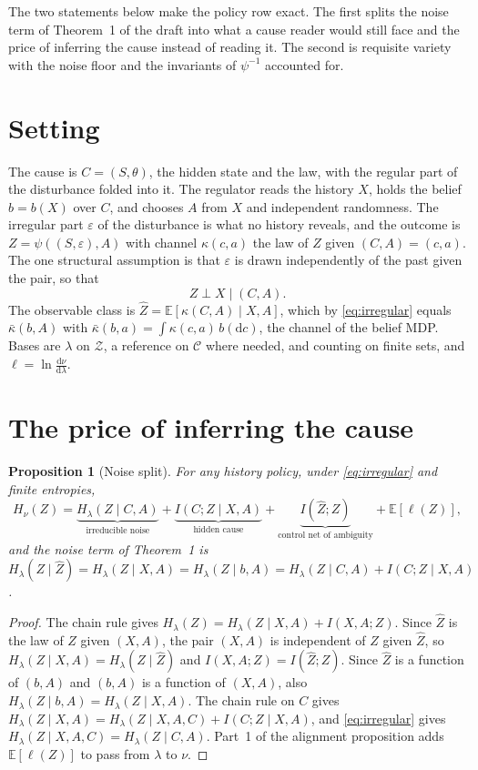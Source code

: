 \documentclass[10pt]{article}
\theoremstyle{plain}
\newtheorem{proposition}{Proposition}
\theoremstyle{remark}
\newcommand{\E}{\mathbb E}
\newcommand{\Zcal}{\mathcal Z}
\newcommand{\Ccal}{\mathcal C}
\newcommand{\dd}{\mathrm d}
\begin{document}
The two statements below make the policy row exact.
The first splits the noise term of Theorem~1 of the draft into what a cause reader would still face and the price of inferring the cause instead of reading it.
The second is requisite variety with the noise floor and the invariants of $\psi^{-1}$ accounted for.

\section{Setting}
The cause is $C = (S, \theta)$, the hidden state and the law, with the regular part of the disturbance folded into it.
The regulator reads the history $X$, holds the belief $b = b(X)$ over $C$, and chooses $A$ from $X$ and independent randomness.
The irregular part $\varepsilon$ of the disturbance is what no history reveals, and the outcome is $Z = \psi((S,\varepsilon), A)$ with channel $\kappa(c,a)$ the law of $Z$ given $(C,A) = (c,a)$.
The one structural assumption is that $\varepsilon$ is drawn independently of the past given the pair, so that
\begin{equation}
  Z \perp X \mid (C, A).
  \label{eq:irregular}
\end{equation}
The observable class is $\hat Z = \E[\kappa(C,A) \mid X, A]$, which by \eqref{eq:irregular} equals $\bar\kappa(b, A)$ with $\bar\kappa(b,a) = \int \kappa(c,a)\, b(\dd c)$, the channel of the belief MDP.
Bases are $\lambda$ on $\Zcal$, a reference on $\Ccal$ where needed, and counting on finite sets, and $\ell = \ln \tfrac{\dd\nu}{\dd\lambda}$.

\section{The price of inferring the cause}
\begin{proposition}[Noise split]
\label{prop:noise-split}
For any history policy, under \eqref{eq:irregular} and finite entropies,
\begin{equation}
  H_\nu(Z) = \underbrace{H_\lambda(Z \mid C, A)}_{\text{irreducible noise}} + \underbrace{I(C; Z \mid X, A)}_{\text{hidden cause}} + \underbrace{I(\hat Z; Z)}_{\text{control net of ambiguity}} + \E[\ell(Z)],
  \label{eq:noise-split}
\end{equation}
and the noise term of Theorem~1 is $H_\lambda(Z \mid \hat Z) = H_\lambda(Z \mid X, A) = H_\lambda(Z \mid b, A) = H_\lambda(Z \mid C,A) + I(C; Z \mid X, A)$.
\end{proposition}
\begin{proof}
The chain rule gives $H_\lambda(Z) = H_\lambda(Z \mid X,A) + I(X,A; Z)$.
Since $\hat Z$ is the law of $Z$ given $(X,A)$, the pair $(X,A)$ is independent of $Z$ given $\hat Z$, so $H_\lambda(Z \mid X,A) = H_\lambda(Z \mid \hat Z)$ and $I(X,A;Z) = I(\hat Z; Z)$.
Since $\hat Z$ is a function of $(b,A)$ and $(b,A)$ is a function of $(X,A)$, also $H_\lambda(Z \mid b,A) = H_\lambda(Z \mid X,A)$.
The chain rule on $C$ gives $H_\lambda(Z \mid X,A) = H_\lambda(Z \mid X,A,C) + I(C;Z \mid X,A)$, and \eqref{eq:irregular} gives $H_\lambda(Z \mid X,A,C) = H_\lambda(Z \mid C,A)$.
Part~1 of the alignment proposition adds $\E[\ell(Z)]$ to pass from $\lambda$ to $\nu$.
\end{proof}
\end{document}

